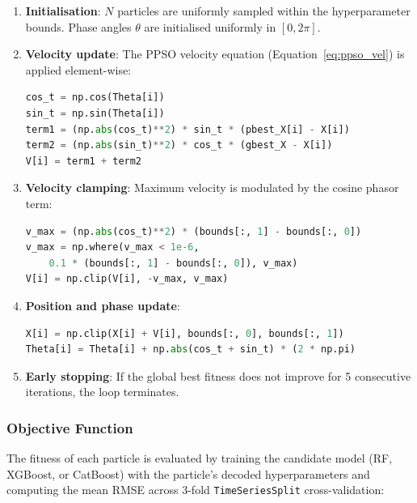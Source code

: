 \begin{enumerate}
    \item \textbf{Initialisation}: $N$ particles are uniformly sampled within the hyperparameter bounds. Phase angles $\theta$ are initialised uniformly in $[0, 2\pi]$.
    
    \item \textbf{Velocity update}: The PPSO velocity equation (Equation~\ref{eq:ppso_vel}) is applied element-wise:
    \begin{lstlisting}[language=Python, caption={PPSO velocity update implementation.}, label={lst:ppso_vel}]
cos_t = np.cos(Theta[i])
sin_t = np.sin(Theta[i])
term1 = (np.abs(cos_t)**2) * sin_t * (pbest_X[i] - X[i])
term2 = (np.abs(sin_t)**2) * cos_t * (gbest_X - X[i])
V[i] = term1 + term2
    \end{lstlisting}
    
    \item \textbf{Velocity clamping}: Maximum velocity is modulated by the cosine phasor term:
    \begin{lstlisting}[language=Python, caption={PPSO velocity clamping.}, label={lst:ppso_clamp}]
v_max = (np.abs(cos_t)**2) * (bounds[:, 1] - bounds[:, 0])
v_max = np.where(v_max < 1e-6,
    0.1 * (bounds[:, 1] - bounds[:, 0]), v_max)
V[i] = np.clip(V[i], -v_max, v_max)
    \end{lstlisting}
    
    \item \textbf{Position and phase update}:
    \begin{lstlisting}[language=Python, caption={PPSO position and phase angle update.}, label={lst:ppso_pos}]
X[i] = np.clip(X[i] + V[i], bounds[:, 0], bounds[:, 1])
Theta[i] = Theta[i] + np.abs(cos_t + sin_t) * (2 * np.pi)
    \end{lstlisting}
    
    \item \textbf{Early stopping}: If the global best fitness does not improve for 5 consecutive iterations, the loop terminates.
\end{enumerate}

\subsubsection{Objective Function}

The fitness of each particle is evaluated by training the candidate model (RF, XGBoost, or CatBoost) with the particle's decoded hyperparameters and computing the mean RMSE across 3-fold \texttt{TimeSeriesSplit} cross-validation:

